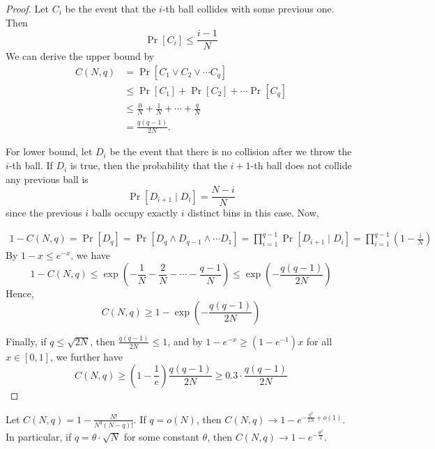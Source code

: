 \begin{proof}

Let $C_i$ be the event that the $i$-th ball collides with some previous one. Then
\[
	\Pr[C_i] \leq \frac{i-1}{N}
\]
We can derive the upper bound by
\begin{align*}
C(N,q) &= \Pr[C_1 \vee C_2 \vee \cdots C_q] \\
&\leq \Pr[C_1] + \Pr[C_2] + \cdots \Pr[C_q] \\
& \leq \frac{0}{N} + \frac{1}{N} + \cdots + \frac{q}{N} \\
&= \frac{q(q-1)}{2N}.
\end{align*}

For lower bound, let $D_i$ be the event that there is no collision after we throw the $i$-th ball. If $D_i$ is true, then the probability that the $i+1$-th ball does not collide any previous ball is
\[
	\Pr[D_{i+1} \mid D_i] = \frac{N-i}{N}
\]
since the previous $i$ balls occupy exactly $i$ distinct bins in this case. Now,

\begin{align*}
1 - C(N,q) =  \Pr[D_q] = \Pr[D_q \wedge D_{q-1} \wedge \cdots D_{1}] = \prod_{i=1}^{q-1} \Pr[D_{i+1} \mid D_i] = \prod_{i=1}^{q-1} (1 - \frac{i}{N})
\end{align*}
By $1-x \leq e^{-x}$, we have
\[
	1 - C(N,q) \leq \exp\left(-\frac{1}{N} - \frac{2}{N} - \cdots - \frac{q-1}{N} \right) \leq \exp\left(-\frac{q(q-1)}{2N}\right)
\]
Hence,
\[
	C(N,q) \geq  1- \exp\left( -\frac{q(q-1)}{2N} \right)
\]

Finally, if $q \leq \sqrt{2N}$, then $\frac{q(q-1)}{2N} \leq 1$, and by $1-e^{-x} \geq (1-e^{-1})x$ for all $x \in [0,1]$, we further have
\[
	C(N,q) \geq (1-\frac{1}{e}) \frac{q(q-1)}{2N} \geq 0.3 \cdot \frac{q(q-1)}{2N}
\]

\end{proof}


\begin{theorem}
	Let $C(N,q) = 1 - \frac{N!}{N^q (N-q)!}$. If $q = o(N)$, then $C(N,q) \to 1 - e^{-\frac{q^2}{2N} + o(1)}$. In particular, if $q = \theta \cdot \sqrt{N}$ for some constant $\theta$, then $C(N,q) \to 1 - e^{-\frac{\theta^2}{2} }$.
\end{theorem}

